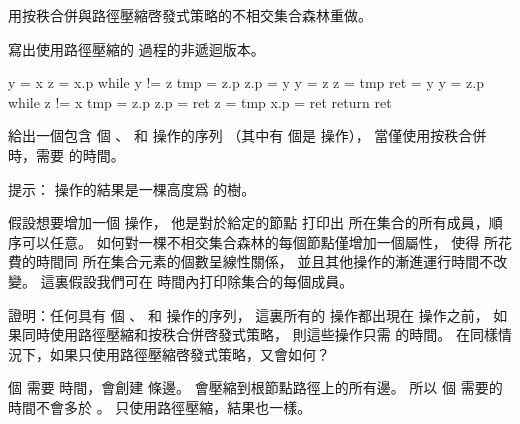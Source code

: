 \startsection[
  title={Disjoint-set forests},
  reference=section:disjoint_set_forests,
]

\startEXERCISE
用按秩合併與路徑壓縮啓發式策略的不相交集合森林重做\inexercise[21.2-2]。
\stopEXERCISE

\startANSWER
{}
\stopANSWER

\startEXERCISE
寫出使用路徑壓縮的  過程的非遞迴版本。
\stopEXERCISE

\startANSWER
{}
\startCLRS
y = x
z = x.p
while y != z
	tmp = z.p
	z.p = y
	y = z
	z = tmp
ret = y
y = z.p
while z != x
	tmp = z.p
	z.p = ret
	z = tmp
x.p = ret
return ret
\stopCLRS
\stopANSWER

\startEXERCISE
給出一個包含  個 、  和  操作的序列
（其中有  個是  操作），
當僅使用按秩合併時，需要  的時間。
\stopEXERCISE

\startANSWER
提示：  操作的結果是一棵高度爲  的樹。
\stopANSWER

\startEXERCISE
假設想要增加一個  操作，
他是對於給定的節點  打印出  所在集合的所有成員，順序可以任意。
如何對一棵不相交集合森林的每個節點僅增加一個屬性，
使得  所花費的時間同  所在集合元素的個數呈線性關係，
並且其他操作的漸進運行時間不改變。
這裏假設我們可在  時間內打印除集合的每個成員。
\stopEXERCISE

\startANSWER
{}
\stopANSWER

\startEXERCISE\DIFFICULT
證明：任何具有  個 、  和  操作的序列，
這裏所有的  操作都出現在  操作之前，
如果同時使用路徑壓縮和按秩合併啓發式策略，
則這些操作只需  的時間。
在同樣情況下，如果只使用路徑壓縮啓發式策略，又會如何？
\stopEXERCISE

\startANSWER
{} 個  需要  時間，會創建  條邊。
  會壓縮到根節點路徑上的所有邊。
所以  個  需要的時間不會多於 。
只使用路徑壓縮，結果也一樣。
\stopANSWER

\stopsection
